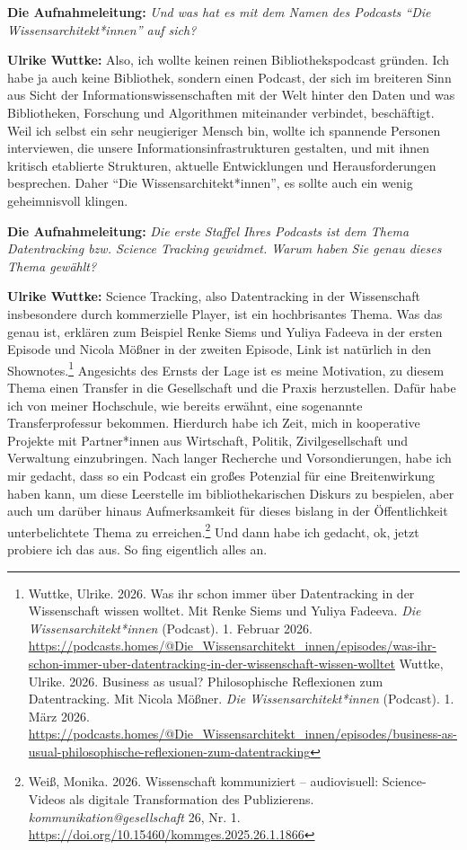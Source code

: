 \documentclass[a4paper,
fontsize=11pt,
oneside,
numbers=noperiodatend,
parskip=half-,
bibliography=totoc,
final
]{scrartcl}
\begin{document}
\textbf{Die Aufnahmeleitung:} \emph{Und was hat es mit dem Namen des
Podcasts \enquote{Die Wissensarchitekt*innen} auf sich?}

\textbf{Ulrike Wuttke:} Also, ich wollte keinen reinen
Bibliothekspodcast gründen. Ich habe ja auch keine Bibliothek, sondern
einen Podcast, der sich im breiteren Sinn aus Sicht der
Informationswissenschaften mit der Welt hinter den Daten und was
Bibliotheken, Forschung und Algorithmen miteinander verbindet,
beschäftigt. Weil ich selbst ein sehr neugieriger Mensch bin, wollte ich
spannende Personen interviewen, die unsere Informationsinfrastrukturen
gestalten, und mit ihnen kritisch etablierte Strukturen, aktuelle
Entwicklungen und Herausforderungen besprechen. Daher \enquote{Die
Wissensarchitekt*innen}, es sollte auch ein wenig geheimnisvoll klingen.

\textbf{Die Aufnahmeleitung:} \emph{Die erste Staffel Ihres Podcasts ist
dem Thema Datentracking bzw. Science Tracking gewidmet. Warum haben Sie
genau dieses Thema gewählt?}

\textbf{Ulrike Wuttke:} Science Tracking, also Datentracking in der
Wissenschaft insbesondere durch kommerzielle Player, ist ein
hochbrisantes Thema. Was das genau ist, erklären zum Beispiel Renke
Siems und Yuliya Fadeeva in der ersten Episode und Nicola Mößner in der
zweiten Episode, Link ist natürlich in den Shownotes.\footnote{Wuttke,
  Ulrike. 2026. Was ihr schon immer über Datentracking in der
  Wissenschaft wissen wolltet. Mit Renke Siems und Yuliya Fadeeva.
  \emph{Die Wissensarchitekt*innen} (Podcast). 1. Februar 2026.
  \url{https://podcasts.homes/@Die_Wissensarchitekt_innen/episodes/was-ihr-schon-immer-uber-datentracking-in-der-wissenschaft-wissen-wolltet}
  Wuttke, Ulrike. 2026. Business as usual? Philosophische Reflexionen
  zum Datentracking. Mit Nicola Mößner. \emph{Die
  Wissensarchitekt*innen} (Podcast). 1. März 2026.
  \url{https://podcasts.homes/@Die_Wissensarchitekt_innen/episodes/business-as-usual-philosophische-reflexionen-zum-datentracking}}
Angesichts des Ernsts der Lage ist es meine Motivation, zu diesem Thema
einen Transfer in die Gesellschaft und die Praxis herzustellen. Dafür
habe ich von meiner Hochschule, wie bereits erwähnt, eine sogenannte
Transferprofessur bekommen. Hierdurch habe ich Zeit, mich in kooperative
Projekte mit Partner*innen aus Wirtschaft, Politik, Zivilgesellschaft
und Verwaltung einzubringen. Nach langer Recherche und Vorsondierungen,
habe ich mir gedacht, dass so ein Podcast ein großes Potenzial für eine
Breitenwirkung haben kann, um diese Leerstelle im bibliothekarischen
Diskurs zu bespielen, aber auch um darüber hinaus Aufmerksamkeit für
dieses bislang in der Öffentlichkeit unterbelichtete Thema zu
erreichen.\footnote{Weiß, Monika. 2026. Wissenschaft kommuniziert --
  audiovisuell: Science-Videos als digitale Transformation des
  Publizierens. \emph{kommunikation@gesellschaft} 26, Nr. 1.
  \url{https://doi.org/10.15460/kommges.2025.26.1.1866}} Und dann habe
ich gedacht, ok, jetzt probiere ich das aus. So fing eigentlich alles
an.
\end{document}
